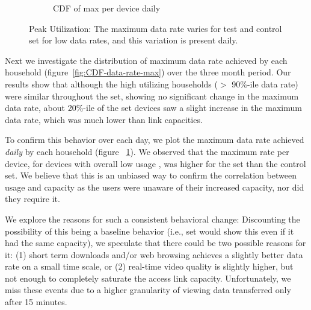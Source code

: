 \begin{figure}[ht!]
\begin{minipage}{0.90\linewidth}
\begin{subfigure}[b]{0.90\linewidth}
  \caption{CDF of max per device daily}
  \vspace{1em}
  \label{fig:CDF-data-rate-max-daily}
\end{subfigure}
\end{minipage}
\caption{Peak Utilization: The maximum data rate varies for test and control set for low data rates, and this variation is present daily.}
\label{fig:peak-utilization}
\end{figure}

Next we investigate the distribution of maximum data rate achieved by each household (figure~\ref{fig:CDF-data-rate-max}) over the three month period. Our results show that although the high utilizing households ($>$ 90\%-ile data rate) were similar throughout the set, showing no significant change in the maximum data rate, about 20\%-ile of the \test set devices saw a slight increase in the maximum data rate, which was much lower than link capacities. 

To confirm this behavior over each day, we plot the maximum data rate achieved \emph{daily} by each household (figure ~\ref{fig:CDF-data-rate-max-daily}). We observed that the maximum rate per device, for  devices with overall low usage , was higher for the \test set than the control set. We believe that this is an unbiased way to confirm the correlation between usage and capacity as the users were unaware of their increased capacity, nor did they require it. 

We explore the reasons for such a consistent behavioral change: Discounting the possibility of this being a baseline behavior (i.e., \test set would show this even if it had the same capacity), we speculate that there could be two possible reasons for it: (1) short term downloads and/or web browsing achieves a slightly better data rate on a small time scale, or (2) real-time video quality is slightly higher, but not enough to completely saturate the access link capacity. Unfortunately, we miss these events due to a higher granularity of viewing data transferred only after 15 minutes.




